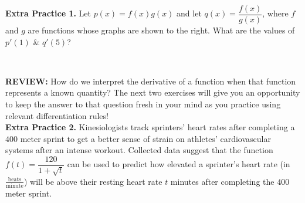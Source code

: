 \documentclass[10pt]{article}
\begin{document}
\begin{minipage}[t]{0.55\textwidth}
{\bf\color{blue} Extra Practice 1.} %
Let $p(x)=f(x)g(x)$ and let $q(x)=\dfrac{f(x)}{g(x)}$, where $f$ and $g$ are functions whose graphs are shown to the right. What are the values of $p'(1)$ \& $q'(5)$? \\
\end{minipage}
\hfill
\begin{minipage}[t]{0.4\textwidth}
\,
\begin{center}
\end{center}
\end{minipage}


\vfill



{\bf REVIEW:} How do we interpret the derivative of a function when that function represents a known quantity? The next two exercises will give you an opportunity to keep the answer to that question fresh in your mind as you practice using relevant differentiation rules!\\

{\bf\color{blue}Extra Practice 2.} %
Kinesiologists track sprinters' heart rates after completing a $400$ meter sprint to get a better sense of strain on athletes' cardiovascular systems after an intense workout. Collected data suggest that the function $f(t)=\dfrac{120}{1+\sqrt{t}}$ can be used to predict how elevated a sprinter's heart rate (in $\frac{\text{beats}}{\text{minute}}$) will be above their resting heart rate $t$ minutes after completing the $400$ meter sprint.
\end{document}
